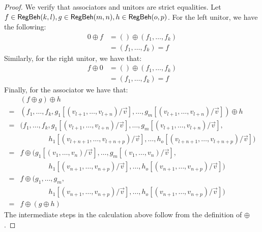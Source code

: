 \begin{proof}
	We verify that associators and unitors are strict equalities. Let $f \in \mathsf{RegBeh}(k,l), g \in \mathsf{RegBeh}(m,n), h \in \mathsf{RegBeh}(o,p)$. For the left unitor, we have the following:
	\begin{align*}
		0 \oplus f &= () \oplus (f_1, \dots, f_k) \tag{def. of $0$ and $\oplus$}\\
		&= (f_1, \dots, f_k) = f
	\end{align*}
	Similarly, for the right unitor, we have that:
	\begin{align*}
		f \oplus 0 &= () \oplus (f_1, \dots, f_k) \tag{def. of $0$ and $\oplus$}\\
		&= (f_1, \dots, f_k) = f
	\end{align*}
	Finally, for the associator we have that:
	\begin{align*}
		 &(f \oplus g) \oplus h\\
		=& (f_1, \dots, f_k, g_1[(v_{l+1}, \dots, v_{l + n})/\vec{v}], \dots, g_m[(v_{l+1}, \dots, v_{l + n})/\vec{v}]) \oplus h \\
		=& (f_1, \dots, f_k, g_1[(v_{l+1}, \dots, v_{l + n})/\vec{v}], \dots, g_m[(v_{l+1}, \dots, v_{l + n})/\vec{v}], \\
		&\qquad\qquad h_1 [(v_{l + n +1}, \dots, v_{l + n + p})/\vec{v}], \dots, h_o [(v_{l + n + 1}, \dots, v_{l + n + p})/\vec{v}])\\
		=& f \oplus  (g_1[(v_{1}, \dots, v_{n})/\vec{v}], \dots, g_m[(v_{1}, \dots, v_{n})/\vec{v}], \\
		&\qquad\qquad h_1 [(v_{n +1}, \dots, v_{n + p})/\vec{v}], \dots, h_o [(v_{n +1}, \dots, v_{n + p})/\vec{v}])\\
		=& f \oplus  (g_1, \dots, g_m, \\
		&\qquad\qquad h_1 [(v_{n +1}, \dots, v_{n + p})/\vec{v}], \dots, h_o [(v_{n +1}, \dots, v_{n + p})/\vec{v}])\\
		=& f \oplus  (g \oplus h)
	\end{align*}
	The intermediate steps in the calculation above follow from the definition of $\oplus$.
\end{proof}



